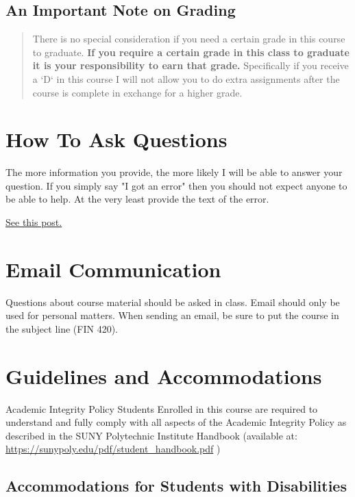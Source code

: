 \documentclass[11pt]{article}
\begin{document}
\subsection{An Important Note on Grading}
\label{sec:orge65391c}

\begin{quote}
There is no special consideration if you need a certain grade in this course to graduate.  \textbf{\textbf{If you require a certain grade in this class to graduate it is your responsibility to earn that grade.}} Specifically if you receive a `D` in this course I will not allow you to do extra assignments after the course is complete in exchange for a higher grade. 
\end{quote}
\section{How To Ask Questions}
\label{sec:orgc5ecfc6}

The more information you provide, the more likely I will be able to answer your question.  If you simply say "I got an error" then you should not expect anyone to be able to help.  At the very least provide the text of the error.

\href{https://stackoverflow.com/help/how-to-ask}{See this post.}  
\section{Email Communication}
\label{sec:orgd30e363}

Questions about course material should be asked in class.  Email should only be used for personal matters.  When sending an email, be sure to put the course in the subject line (FIN 420). 
\section{Guidelines and Accommodations}
\label{sec:org2484e2c}

Academic Integrity Policy Students Enrolled in this course are required to understand and fully comply with all aspects of the Academic Integrity Policy as described in the SUNY Polytechnic Institute Handbook (available at:  \url{https://sunypoly.edu/pdf/student\_handbook.pdf} )
\subsection{Accommodations for Students with Disabilities}
\label{sec:org1fc96f9}
\end{document}
